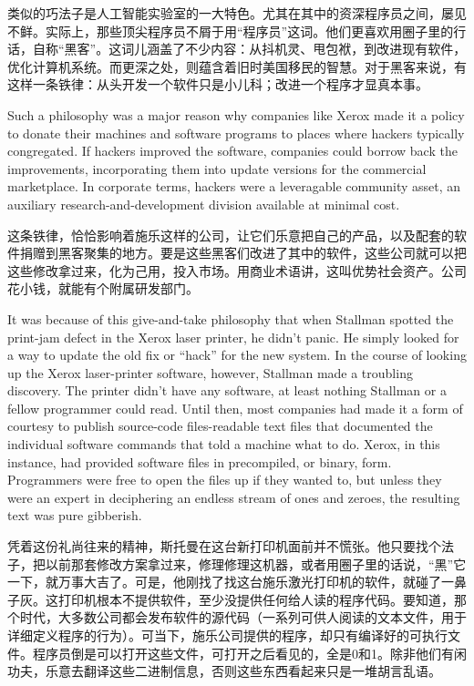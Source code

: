 \ifdefined\chs
类似的巧法子是人工智能实验室的一大特色。尤其在其中的资深程序员之间，屡见不鲜。实际上，那些顶尖程序员不屑于用``程序员''这词。他们更喜欢用圈子里的行话，自称``黑客''。这词儿涵盖了不少内容：从抖机灵、甩包袱，到改进现有软件，优化计算机系统。而更深之处，则蕴含着旧时美国移民的智慧。对于黑客来说，有这样一条铁律：从头开发一个软件只是小儿科；改进一个程序才显真本事。
\fi

\ifdefined\vone
\ifdefined\eng
Such a philosophy was a major reason why companies like Xerox made it a policy to donate their machines and software programs to places where hackers typically congregated. If hackers improved the software, companies could borrow back the improvements, incorporating them into update versions for the commercial marketplace. In corporate terms, hackers were a leveragable community asset, an auxiliary research-and-development division available at minimal cost.
\fi

\ifdefined\chs
这条铁律，恰恰影响着施乐这样的公司，让它们乐意把自己的产品，以及配套的软件捐赠到黑客聚集的地方。要是这些黑客们改进了其中的软件，这些公司就可以把这些修改拿过来，化为己用，投入市场。用商业术语讲，这叫优势社会资产。公司花小钱，就能有个附属研发部门。
\fi

\ifdefined\eng
It was because of this give-and-take philosophy that when Stallman spotted the print-jam defect in the Xerox laser printer, he didn't panic. He simply looked for a way to update the old fix or ``hack'' for the new system. In the course of looking up the Xerox laser-printer software, however, Stallman made a troubling discovery. The printer didn't have any software, at least nothing Stallman or a fellow programmer could read. Until then, most companies had made it a form of courtesy to publish source-code files-readable text files that documented the individual software commands that told a machine what to do. Xerox, in this instance, had provided software files in precompiled, or binary, form. Programmers were free to open the files up if they wanted to, but unless they were an expert in deciphering an endless stream of ones and zeroes, the resulting text was pure gibberish.
\fi

\ifdefined\chs
凭着这份礼尚往来的精神，斯托曼在这台新打印机面前并不慌张。他只要找个法子，把以前那套修改方案拿过来，修理修理这机器，或者用圈子里的话说，``黑''它一下，就万事大吉了。可是，他刚找了找这台施乐激光打印机的软件，就碰了一鼻子灰。这打印机根本不提供软件，至少没提供任何给人读的程序代码。要知道，那个时代，大多数公司都会发布软件的源代码（一系列可供人阅读的文本文件，用于详细定义程序的行为）。可当下，施乐公司提供的程序，却只有编译好的可执行文件。程序员倒是可以打开这些文件，可打开之后看见的，全是0和1。除非他们有闲功夫，乐意去翻译这些二进制信息，否则这些东西看起来只是一堆胡言乱语。
\fi


